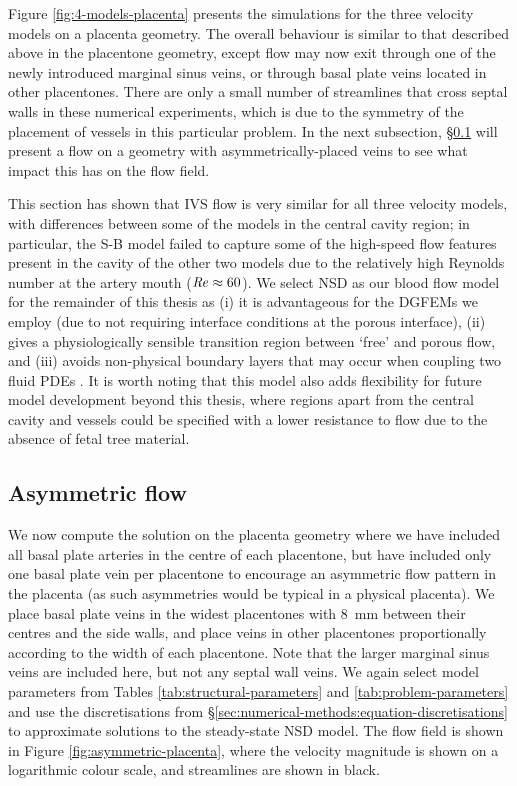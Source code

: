             Figure \ref{fig:4-models-placenta} presents the simulations for the three velocity models on a placenta geometry. The overall behaviour is similar to that described above in the placentone geometry, except flow may now exit through one of the newly introduced marginal sinus veins, or through basal plate veins located in other placentones. There are only a small number of streamlines that cross septal walls in these numerical experiments, which is due to the symmetry of the placement of vessels in this particular problem. In the next subsection, \S\ref{sec:numerical-methods:blood-flow-experiments:asymmetric} will present a flow on a geometry with asymmetrically-placed veins to see what impact this has on the flow field.

            This section has shown that IVS flow is very similar for all three velocity models, with differences between some of the models in the central cavity region; in particular, the S-B model failed to capture some of the high-speed flow features present in the cavity of the other two models due to the relatively high Reynolds number at the artery mouth ($\operatorname{\mbox{\textit{Re}}} \approx 60$). We select NSD as our blood flow model for the remainder of this thesis as (i) it is advantageous for the DGFEMs we employ (due to not requiring interface conditions at the porous interface), (ii) gives a physiologically sensible transition region between `free' and porous flow, and (iii) avoids non-physical boundary layers that may occur when coupling two fluid PDEs \cite{nealePracticalSignificanceBrinkman1974}. It is worth noting that this model also adds flexibility for future model development beyond this thesis, where regions apart from the central cavity and vessels could be specified with a lower resistance to flow due to the absence of fetal tree material.
    
        \subsection{Asymmetric flow} \label{sec:numerical-methods:blood-flow-experiments:asymmetric}
            We now compute the solution on the placenta geometry where we have included all basal plate arteries in the centre of each placentone, but have included only one basal plate vein per placentone to encourage an asymmetric flow pattern in the placenta (as such asymmetries would be typical in a physical placenta). We place basal plate veins in the widest placentones with \qty{8}{\milli\metre} between their centres and the side walls, and place veins in other placentones proportionally according to the width of each placentone. Note that the larger marginal sinus veins are included here, but not any septal wall veins. We again select model parameters from Tables \ref{tab:structural-parameters} and \ref{tab:problem-parameters} and use the discretisations from \S\ref{sec:numerical-methods:equation-discretisations} to approximate solutions to the steady-state NSD model. The flow field is shown in Figure \ref{fig:asymmetric-placenta}, where the velocity magnitude is shown on a logarithmic colour scale, and streamlines are shown in black.

